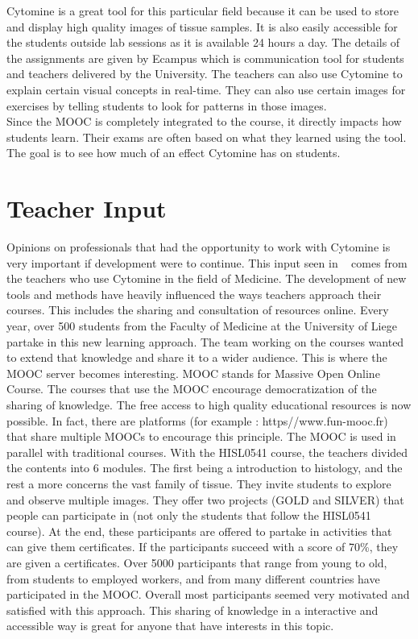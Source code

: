\documentclass[a4paper,11pt]{report}
\numberwithin{figure}{chapter} %
\begin{document}
Cytomine is a great tool for this particular field because it can be used to store and display high quality images of tissue samples.
It is also easily accessible for the students outside lab sessions as it is available 24 hours a day.
The details of the assignments are given by Ecampus which is communication tool for students and teachers delivered by the University.
The teachers can also use Cytomine to explain certain visual concepts in real-time.
They can also use certain images for exercises by telling students to look for patterns in those images.\\

Since the MOOC is completely integrated to the course, it directly impacts how students learn.
Their exams are often based on what they learned using the tool.
The goal is to see how much of an effect Cytomine has on students.


\section{Teacher Input}

    Opinions on professionals that had the opportunity to work with Cytomine is very important if development were to continue.
    This input seen in ~\cite{hist} comes from the teachers who use Cytomine in the field of Medicine.
    The development of new tools and methods have heavily influenced the ways teachers approach their courses.
    This includes the sharing and consultation of resources online.
    Every year, over 500 students from the Faculty of Medicine at the University of Liege partake in this new learning approach.
    The team working on the courses wanted to extend that knowledge and share it to a wider audience.
    This is where the MOOC server becomes interesting.
    MOOC stands for Massive Open Online Course.
    The courses that use the MOOC encourage democratization of the sharing of knowledge.
    The free access to high quality educational resources is now possible.
    In fact, there are platforms (for example : https//www.fun-mooc.fr) that share multiple MOOCs to encourage this principle.
    The MOOC is used in parallel with traditional courses.
    With the HISL0541 course, the teachers divided the contents into 6 modules.
    The first being a introduction to histology, and the rest a more concerns the vast family of tissue.
    They invite students to explore and observe multiple images.
    They offer two projects (GOLD and SILVER) that people can participate in (not only the students that follow the HISL0541 course).
    At the end, these participants are offered to partake in activities that can give them certificates.
    If the participants succeed with a score of 70\%, they are given a certificates.
    Over 5000 participants that range from young to old, from students to employed workers, and from many different countries have participated in the MOOC.
    Overall most participants seemed very motivated and satisfied with this approach.
    This sharing of knowledge in a interactive and accessible way is great for anyone that have interests in this topic.
\end{document}
